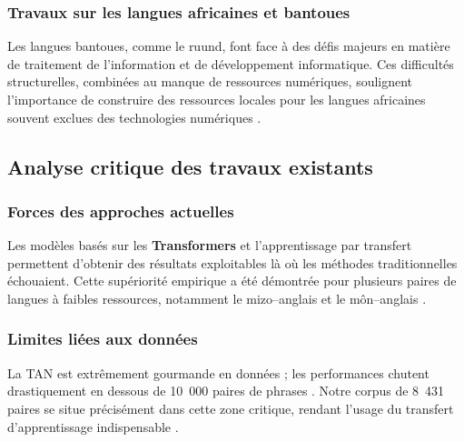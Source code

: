 \subsubsection{Travaux sur les langues africaines et bantoues}


Les langues bantoues, comme le ruund, font face à des défis majeurs en matière de traitement de l'information et de développement informatique.  Ces difficultés structurelles, combinées au manque de ressources numériques, soulignent l'importance de construire des ressources locales pour les langues africaines souvent exclues des technologies numériques \cite{ranathunga2023neural}.

\subsection{Analyse critique des travaux existants}

\subsubsection{Forces des approches actuelles}

Les modèles basés sur les \textbf{Transformers} et l'apprentissage par transfert permettent d'obtenir des résultats exploitables là où les méthodes traditionnelles échouaient. Cette supériorité empirique a été démontrée pour plusieurs paires de langues à faibles ressources, notamment le mizo--anglais \cite{lalrempuii2021improved} et le môn--anglais \cite{tun2025exploring}.

\subsubsection{Limites liées aux données}

La \ac{TAN} est extrêmement gourmande en données ; les performances chutent drastiquement en dessous de 10~000 paires de phrases \cite{ranathunga2023neural}. Notre corpus de 8~431 paires se situe précisément dans cette zone critique, rendant l'usage du transfert d'apprentissage indispensable \cite{ma2025dongba}.

